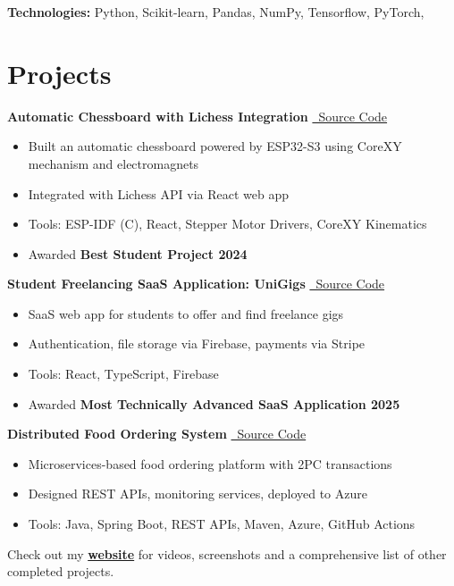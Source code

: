 \documentclass[10pt,a4paper]{article}
\newenvironment{highlights}{\begin{itemize}}{\end{itemize}}
\begin{document}
\textbf{Technologies:} Python, Scikit-learn, Pandas, NumPy, Tensorflow, PyTorch,

\section{Projects}
\textbf{Automatic Chessboard with Lichess Integration} \hfill \href{https://github.com/Yornared/ESP32_Chessboard_code}{\faGithub\ Source Code}
\begin{highlights}
    \item Built an automatic chessboard powered by ESP32-S3 using CoreXY mechanism and electromagnets
    \item Integrated with Lichess API via React web app
    \item Tools: ESP-IDF (C), React, Stepper Motor Drivers, CoreXY Kinematics
    \item Awarded \textbf{Best Student Project 2024}
\end{highlights}

\textbf{Student Freelancing SaaS Application: UniGigs} \hfill \href{https://github.com/Yornared/FreelanceApp}{\faGithub\ Source Code}
\begin{highlights}
    \item SaaS web app for students to offer and find freelance gigs
    \item Authentication, file storage via Firebase, payments via Stripe
    \item Tools: React, TypeScript, Firebase
    \item Awarded \textbf{Most Technically Advanced SaaS Application 2025}
\end{highlights}

\textbf{Distributed Food Ordering System} \hfill \href{https://github.com/Yornared/Food-ordering-webshop}{\faGithub\ Source Code}
\begin{highlights}
    \item Microservices-based food ordering platform with 2PC transactions
    \item Designed REST APIs, monitoring services, deployed to Azure
    \item Tools: Java, Spring Boot, REST APIs, Maven, Azure, GitHub Actions
\end{highlights}

\vspace{.5cm}
Check out my \href{yornared.github.io}{\textbf{website}} for videos, screenshots and a comprehensive list of other completed projects.
\end{document}
